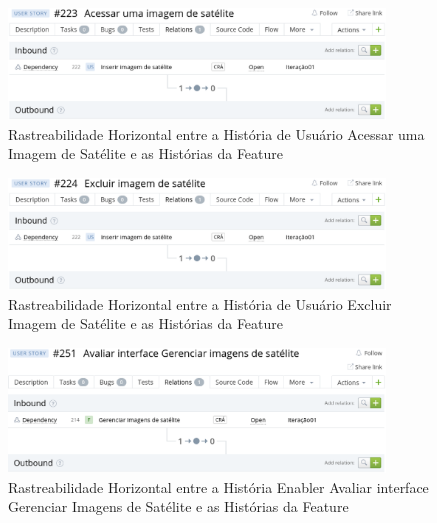   \begin{figure}[!htb]
    \centering
    \includegraphics[width=10cm, keepaspectratio=false]{figuras/rastreabilidade/horizontal/gerenciar_imagens/historia_acessar_imagem.eps}
    \caption{Rastreabilidade Horizontal entre a História de Usuário Acessar uma Imagem de Satélite e as Histórias da Feature}
  \end{figure}

  \begin{figure}[!htb]
    \centering
    \includegraphics[width=10cm, keepaspectratio=false]{figuras/rastreabilidade/horizontal/gerenciar_imagens/historia_excluir_imagem.eps}
    \caption{Rastreabilidade Horizontal entre a História de Usuário Excluir Imagem de Satélite e
as Histórias da Feature}
  \end{figure}

  \begin{figure}[!htb]
    \centering
    \includegraphics[width=10cm, keepaspectratio=false]{figuras/rastreabilidade/horizontal/gerenciar_imagens/historia_avaliar_satelite.eps}
    \caption{Rastreabilidade Horizontal entre a História Enabler Avaliar interface Gerenciar Imagens de Satélite e as Histórias da Feature}
  \end{figure}